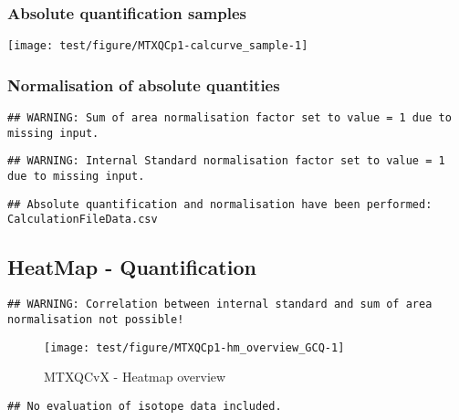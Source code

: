 \documentclass[9pt,]{article}
\begin{document}
\subsubsection{Absolute quantification
samples}\label{absolute-quantification-samples}

\begin{center}\texttt{[image: test/figure/MTXQCp1-calcurve\_sample-1]} \end{center}

\subsubsection{Normalisation of absolute
quantities}\label{normalisation-of-absolute-quantities}

\begin{verbatim}
## WARNING: Sum of area normalisation factor set to value = 1 due to missing input.
\end{verbatim}

\begin{verbatim}
## WARNING: Internal Standard normalisation factor set to value = 1 due to missing input.
\end{verbatim}

\begin{verbatim}
## Absolute quantification and normalisation have been performed: CalculationFileData.csv
\end{verbatim}

\subsection{HeatMap - Quantification}\label{heatmap---quantification}

\begin{verbatim}
## WARNING: Correlation between internal standard and sum of area normalisation not possible!
\end{verbatim}

\begin{figure}

{\centering \texttt{[image: test/figure/MTXQCp1-hm\_overview\_GCQ-1]} 

}

\caption{MTXQCvX - Heatmap overview}\label{fig:hm_overview_GCQ}
\end{figure}

\begin{verbatim}
## No evaluation of isotope data included.
\end{verbatim}
\newpage
\singlespacing 
\end{document}
